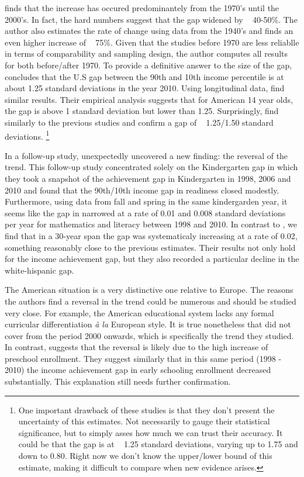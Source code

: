 \documentclass[11pt, a4paper]{article}\usepackage[]{graphicx}\usepackage[]{color}
\begin{document}
\citet{reardon2011} finds that the increase has occured predominantely from the 1970's until the 2000's. In fact, the hard numbers suggest that the gap widened by ~ 40-50\%. The author also estimates the rate of change using data from the 1940's and finds an even higher increase of ~ 75\%. Given that the studies before 1970 are less reliablle in terms of comparability and sampling design, the author computes all results for both before/after 1970. To provide a definitive answer to the size of the gap, \citet{reardon2011} concludes that the U.S gap between the 90th and 10th income percentile is at about 1.25 standard deviations in the year 2010. Using longitudinal data, \citet{bradbury2015} find similar results. Their empirical analysis suggests that for American 14 year olds, the gap is above 1 standard deviation but lower than 1.25. Surprisingly, \citet{duncan2011} find similarly to the previous studies and confirm a gap of ~ 1.25/1.50 standard deviations. \footnote{One important drawback of these studies is that they don't present the uncertainty of this estimates. Not necessarily to gauge their statistical significance, but to simply asses how much we can trust their accuracy. It could be that the gap is at ~ 1.25 standard deviations, varying up to 1.75 and down to 0.80. Right now we don't know the upper/lower bound of this estimate, making it difficult to compare when new evidence arises.}

In a follow-up study, \citet{reardon_portilla} unexpectedly uncovered a new finding: the reversal of the trend. This follow-up study concentrated solely on the Kindergarten gap in which they took a snapshot of the achievement gap in Kindergarten in 1998, 2006 and 2010 and found that the 90th/10th income gap in readiness closed modestly. Furthermore, using data from fall and spring in the same kindergarden year, it seems like the gap in narrowed at a rate of 0.01 and 0.008 standard deviations per year for mathematics and literacy between 1998 and 2010. In contrast to \citep{reardon2011}, we find that in a 30-year span the gap was systematicaly increasing at a rate of 0.02, something reasonably close to the previous estimates. Their results not only hold for the income achievement gap, but they also recorded a particular decline in the white-hispanic gap.

The American situation is a very distinctive one relative to Europe. The reasons the authors find a reversal in the trend could be numerous and should be studied very close. For example, the American educational system lacks any formal curricular differentiation \emph{à la} European style. It is true nonetheless that \citet{reardon2011} did not cover from the period 2000 onwards, which is specifically the trend they studied. In contrast, \citet{reardon2011} suggests that the reversal is likely due to the high increase of preschool enrollment. They suggest similarly that in this same period (1998 - 2010) the income achievement gap in early schooling enrollment decreased substantially. This explanation still needs further confirmation.
\end{document}
